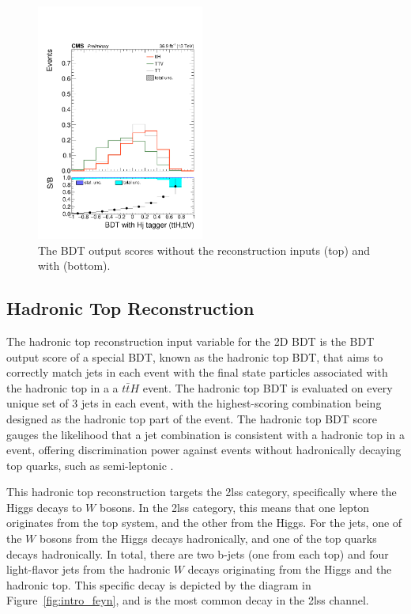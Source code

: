 \begin{figure}[htp]
\includegraphics[width=0.49\textwidth]{ch8_figs/kinMVA_2lss_ttV_withHj.pdf}
\caption[BDT output scores with and without reconstruction inputs]{The BDT output scores without the reconstruction inputs (top) and with (bottom).}
\label{fig:inputs3}
\end{figure}

\subsection{Hadronic Top Reconstruction}
The hadronic top reconstruction input variable for the 2D BDT is the BDT output score of a special BDT, known as the hadronic top BDT,
that aims to correctly match jets in each event with the final state particles associated with the hadronic top in a 
a $t\bar{t}H$ event. The hadronic top BDT is evaluated on every unique set of 3 jets in each event, with the highest-scoring combination
being designed as the hadronic top part of the event. The hadronic top BDT score gauges the likelihood that a jet combination is
consistent with a hadronic top in a \tth event, offering discrimination power against events without hadronically decaying top quarks, such as
semi-leptonic \ttbar.

This hadronic top reconstruction targets the 2lss category, specifically where the Higgs decays
to $W$ bosons. In the 2lss category, this means that one lepton originates from the
top system, and the other from the Higgs. For the jets, one of the
$W$ bosons from the Higgs decays hadronically, and one of the top quarks decays
hadronically. In total, there are two b-jets (one from each top) and four light-flavor jets
from the hadronic $W$ decays originating from the Higgs and the hadronic top.
This specific decay is depicted by the diagram in Figure~\ref{fig:intro_feyn}, and is the most common \tth decay in the 2lss channel.

